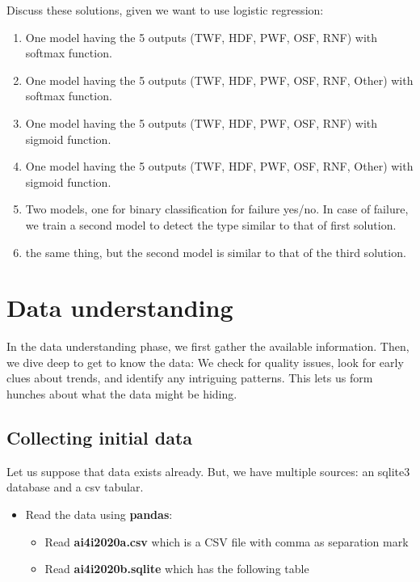 \documentclass[11pt, a4paper]{article}
\begin{document}
\begin{multicols}{2}
Discuss these solutions, given we want to use logistic regression:
\begin{enumerate}
	\item One model having the 5 outputs (TWF, HDF, PWF, OSF, RNF) with softmax function.
	\item One model having the 5 outputs (TWF, HDF, PWF, OSF, RNF, Other) with softmax function.
	\item One model having the 5 outputs (TWF, HDF, PWF, OSF, RNF) with sigmoid function.
	\item One model having the 5 outputs (TWF, HDF, PWF, OSF, RNF, Other) with sigmoid function.
	\item Two models, one for binary classification for failure yes/no. 
	In case of failure, we train a second model to detect the type similar to that of first solution.
	\item the same thing, but the second model is similar to that of the third solution. 
\end{enumerate}


\section{Data understanding}

In the data understanding phase, we first gather the available information. 
Then, we dive deep to get to know the data:  We check for quality issues, look for early clues about trends, and identify any intriguing patterns. 
This lets us form hunches about what the data might be hiding.

\subsection{Collecting initial data}

Let us suppose that data exists already. 
But, we have multiple sources: an sqlite3 database and a csv tabular.
\begin{itemize}
	\item Read the data using \textbf{pandas}:
	\begin{itemize}
		\item Read \textbf{ai4i2020a.csv} which is a CSV file with comma as separation mark
		\item Read \textbf{ai4i2020b.sqlite} which has the following table
	\end{itemize} 
\end{itemize}


\end{multicols}
\end{document}

